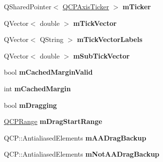 \begin{DoxyCompactItemize}
\item 
Q\+Shared\+Pointer$<$ \hyperlink{classQCPAxisTicker}{Q\+C\+P\+Axis\+Ticker} $>$ {\bfseries m\+Ticker}\hypertarget{classQCPAxis_ad9c3061cbd8bec5b0755d5a0bef3b700}{}\label{classQCPAxis_ad9c3061cbd8bec5b0755d5a0bef3b700}

\item 
Q\+Vector$<$ double $>$ {\bfseries m\+Tick\+Vector}\hypertarget{classQCPAxis_aae0f9b9973b85be601200f00f5825087}{}\label{classQCPAxis_aae0f9b9973b85be601200f00f5825087}

\item 
Q\+Vector$<$ Q\+String $>$ {\bfseries m\+Tick\+Vector\+Labels}\hypertarget{classQCPAxis_aeee4bd0fca3f587eafe33843d1cb4f82}{}\label{classQCPAxis_aeee4bd0fca3f587eafe33843d1cb4f82}

\item 
Q\+Vector$<$ double $>$ {\bfseries m\+Sub\+Tick\+Vector}\hypertarget{classQCPAxis_a28353081e0ff35c3fe5ced923a287faa}{}\label{classQCPAxis_a28353081e0ff35c3fe5ced923a287faa}

\item 
bool {\bfseries m\+Cached\+Margin\+Valid}\hypertarget{classQCPAxis_a2cde37b6e385f47e11322df4ac1b0e9b}{}\label{classQCPAxis_a2cde37b6e385f47e11322df4ac1b0e9b}

\item 
int {\bfseries m\+Cached\+Margin}\hypertarget{classQCPAxis_a48ace55cbd54f7241e7f1b06fd369b64}{}\label{classQCPAxis_a48ace55cbd54f7241e7f1b06fd369b64}

\item 
bool {\bfseries m\+Dragging}\hypertarget{classQCPAxis_ad56b9be14ed8ae9b858d84bdb539b1ca}{}\label{classQCPAxis_ad56b9be14ed8ae9b858d84bdb539b1ca}

\item 
\hyperlink{classQCPRange}{Q\+C\+P\+Range} {\bfseries m\+Drag\+Start\+Range}\hypertarget{classQCPAxis_a4b665f97d37727f0013b93d727e80bd2}{}\label{classQCPAxis_a4b665f97d37727f0013b93d727e80bd2}

\item 
Q\+C\+P\+::\+Antialiased\+Elements {\bfseries m\+A\+A\+Drag\+Backup}\hypertarget{classQCPAxis_a9c34e6f92eda5803e7ce4ea3322a6417}{}\label{classQCPAxis_a9c34e6f92eda5803e7ce4ea3322a6417}

\item 
Q\+C\+P\+::\+Antialiased\+Elements {\bfseries m\+Not\+A\+A\+Drag\+Backup}\hypertarget{classQCPAxis_a0be1bc05fcbf86bd9916cc8faa55dd78}{}\label{classQCPAxis_a0be1bc05fcbf86bd9916cc8faa55dd78}

\end{DoxyCompactItemize}
